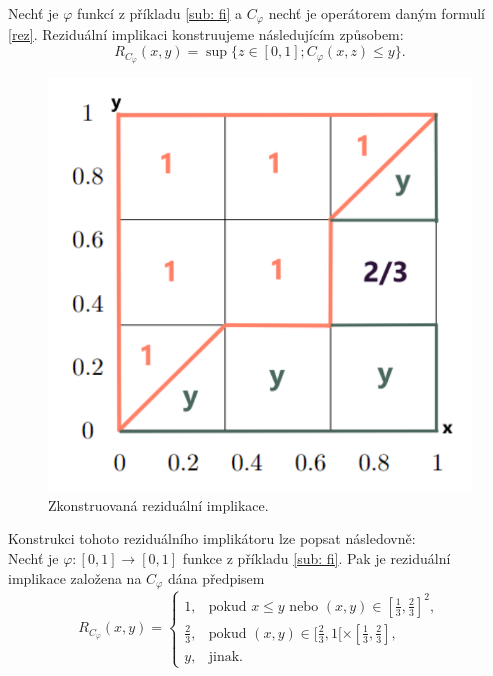 \begin{example} Nech\v t je $\varphi$ funkcí z příkladu \ref{sub: fi} a $C_\varphi$ nech\v t je operátorem daným formulí \ref{rez}. Reziduální implikaci konstruujeme následujícím zp\r usobem: $$R_{C_\varphi}(x,y)=\sup\{z \in [0,1]; C_\varphi(x,z) \leq y\}.$$  


\begin{figure}[H]
    \caption{Zkonstruovaná reziduální implikace.\\}
        \centering
        \includegraphics[scale=0.8]{template-fig/RPhi-impl.pdf}
\end{figure}

\end{example}

Konstrukci tohoto reziduálního implikátoru lze popsat následovn\v e:\\
    Nech\v t je  $\varphi:[0,1]\rightarrow [0,1]$ funkce z příkladu \ref{sub: fi}.
Pak je reziduální implikace zalo\v zena na $C_\varphi$ dána p\v redpisem
$$ R_{C_\varphi}(x,y) = \begin{cases} 1, & \mbox{pokud } x\leq y \mbox{ nebo } (x,y) \in [\frac{1}{3},\frac{2}{3}]^2,\\
\frac{2}{3}, &\mbox {pokud }
(x,y)\in [\frac{2}{3},1[\times[\frac{1}{3},\frac{2}{3}],
\\ y, &\mbox {jinak.}
\end{cases} $$

